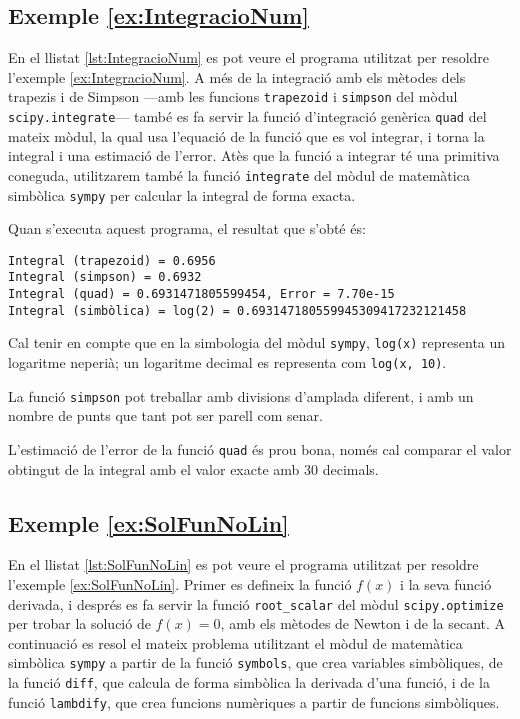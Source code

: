 \hypertarget{exemple:IntegracioNum}{\subsection{Exemple \ref*{ex:IntegracioNum} \IntegracioNum}}
En el llistat \vref{lst:IntegracioNum} es pot veure el programa utilitzat per resoldre l'exemple \vref{ex:IntegracioNum}. A més de la integració amb els  mètodes dels trapezis i de Simpson ---amb les funcions \texttt{trapezoid} i \texttt{simpson} del mòdul \texttt{scipy.integrate}--- també es fa servir la funció  d'integració genèrica \texttt{quad} del mateix mòdul,  la qual usa l'equació de la funció que es vol integrar, i torna la integral i una estimació de l'error. Atès que la funció a integrar té una primitiva coneguda, utilitzarem també la funció \texttt{integrate} del mòdul de matemàtica simbòlica \texttt{sympy} per calcular la integral de forma exacta.


Quan s'executa aquest programa, el resultat que s'obté és:
\lstset{
	language=,
	numbers=none,
	frame=none
}
\begin{lstlisting}
Integral (trapezoid) = 0.6956
Integral (simpson) = 0.6932
Integral (quad) = 0.6931471805599454, Error = 7.70e-15
Integral (simbòlica) = log(2) = 0.693147180559945309417232121458
\end{lstlisting} 

Cal tenir en compte que en la simbologia del mòdul \texttt{sympy}, \texttt{log(x)} representa un logaritme neperià; un logaritme decimal es representa com \texttt{log(x, 10)}.

La funció \texttt{simpson}  pot treballar amb divisions d'amplada diferent, i amb un nombre de punts que tant pot ser parell com senar.

L'estimació de l'error de la funció \texttt{quad} és prou bona, només cal comparar el valor obtingut de la integral  amb el valor exacte amb 30 decimals.


\hypertarget{exemple:SolFunNoLin}{\subsection{Exemple \ref*{ex:SolFunNoLin} \SolFunNoLin}}
En el llistat \vref{lst:SolFunNoLin} es pot veure el programa utilitzat per resoldre l'exemple \vref{ex:SolFunNoLin}. Primer es defineix la funció $f(x)$ i la seva funció derivada, i després es fa servir la funció \texttt{root\_scalar}  del mòdul \texttt{scipy.optimize} per trobar la solució de $f(x)=0$, amb els mètodes de Newton i de la secant. A continuació es resol el mateix problema utilitzant el mòdul  de matemàtica simbòlica \texttt{sympy} a partir de la funció \texttt{symbols}, que crea variables simbòliques, de la funció \texttt{diff}, que calcula de forma simbòlica la derivada d'una funció, i de la funció  \texttt{lambdify}, que crea funcions numèriques a partir de funcions simbòliques.


